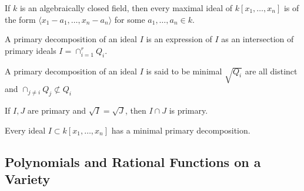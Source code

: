                 \begin{theorem}
                    If $k$ is an algebraically closed field,
                    then every maximal ideal of $k[x_1,\hdots ,x_n]$
                    is of the form
                    $\langle x_1-a_1,\hdots, x_n-a_n\rangle$
                    for some $a_1,\hdots, a_n\in k$.
                \end{theorem}
                \begin{definition}
                    A primary decomposition of an ideal $I$ is
                    an expression of $I$ as an intersection of
                    primary ideals $I=\cap_{i=1}^{r} Q_{i}$.
                \end{definition}
                \begin{definition}
                    A primary decomposition of an ideal $I$
                    is said to be minimal $\sqrt{Q_i}$ are all
                    distinct and
                    $\cap_{j\ne i}Q_j\not\subset Q_i$
                \end{definition}
                \begin{theorem}
                    If $I,J$ are primary and
                    $\sqrt{I}=\sqrt{J}$,
                    then $I\cap J$ is primary.
                \end{theorem}
                \begin{theorem}
                    Every ideal $I \subset k[x_1,\hdots ,x_n]$
                    has a minimal primary decomposition.
                \end{theorem}
        \subsection{Polynomials and Rational Functions on a Variety}
